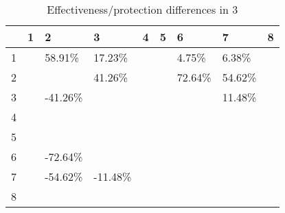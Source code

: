 \begin{table}[ht]
\centering
\begin{tabular}{rllllllll}
  \hline
 & 1 & 2 & 3 & 4 & 5 & 6 & 7 & 8 \\ 
  \hline
1 &  & 58.91\% & 17.23\% &  &  & 4.75\% & 6.38\% &  \\ 
  2 &  &  & 41.26\% &  &  & 72.64\% & 54.62\% &  \\ 
  3 &  & -41.26\% &  &  &  &  & 11.48\% &  \\ 
  4 &  &  &  &  &  &  &  &  \\ 
  5 &  &  &  &  &  &  &  &  \\ 
  6 &  & -72.64\% &  &  &  &  &  &  \\ 
  7 &  & -54.62\% & -11.48\% &  &  &  &  &  \\ 
  8 &  &  &  &  &  &  &  &  \\ 
   \hline
\end{tabular}
\caption{Effectiveness/protection differences in  3} 
\end{table}
